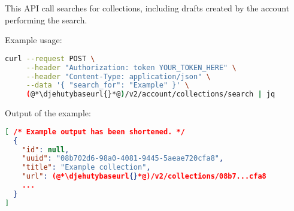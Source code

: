   This API call searches for collections, including drafts created
  by the account performing the search.

  Example usage:
\begin{lstlisting}[language=bash]
curl --request POST \
     --header "Authorization: token YOUR_TOKEN_HERE" \
     --header "Content-Type: application/json" \
     --data '{ "search_for": "Example" }' \
     (@*\djehutybaseurl{}*@)/v2/account/collections/search | jq
\end{lstlisting}

  Output of the example:
\begin{lstlisting}[language=JSON]
[ /* Example output has been shortened. */
  {
    "id": null,
    "uuid": "08b702d6-98a0-4081-9445-5aeae720cfa8",
    "title": "Example collection",
    "url": (@*\djehutybaseurl{}*@)/v2/collections/08b7...cfa8
    ...
  }
]
\end{lstlisting}

